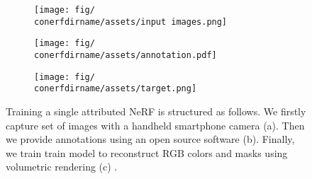 \begin{figure}[!tbhp]
  \centering
  \begin{subfigure}[b]{0.24\columnwidth}
    \centering
    \texttt{[image: fig/\\conerfdirname/assets/input images.png]}
    \caption{}
  \end{subfigure}
  \hfill
  \begin{subfigure}[b]{0.12\columnwidth}
    \centering
    \texttt{[image: fig/\\conerfdirname/assets/annotation.pdf]}
    \caption{}
  \end{subfigure}
  \hfill
  \begin{subfigure}[b]{0.56\columnwidth}
    \centering
    \texttt{[image: fig/\\conerfdirname/assets/target.png]}
    \caption{}
  \end{subfigure}
  \caption{
    Training a single attributed NeRF is structured as follows.
    We firstly capture set of images with a handheld smartphone camera (a).
    Then we provide annotations using an open source software (b).
    Finally, we train train model to reconstruct RGB colors and masks using
    volumetric rendering (c) \cite{mildenhall2020nerf}.
  }
  \label{fig:conerf-capture-pipeline}
\end{figure}